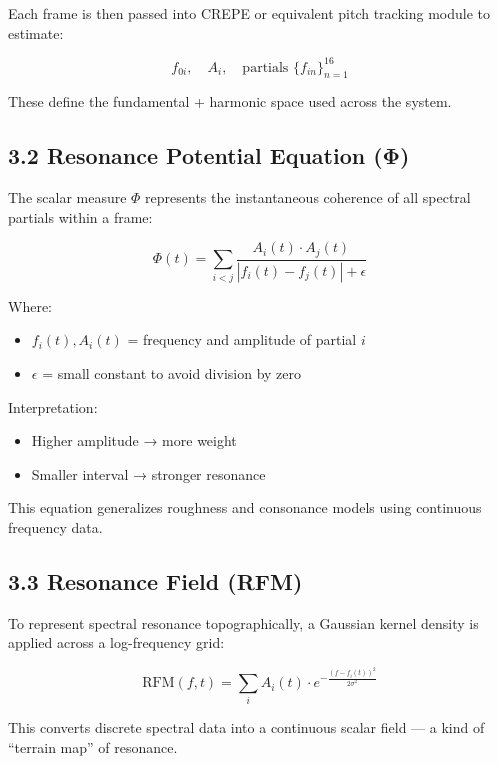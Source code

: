 Each frame is then passed into CREPE or equivalent pitch tracking module to estimate:

\begin{equation}
f_{0i}, \quad A_i, \quad \text{partials } \{f_{in}\}_{n=1}^{16}
\end{equation}

These define the fundamental + harmonic space used across the system.

\subsection*{3.2 Resonance Potential Equation (Φ)}

The scalar measure $\Phi$ represents the instantaneous coherence of all spectral partials within a frame:

\begin{equation}
\Phi(t) = \sum_{i<j} \frac{A_i(t) \cdot A_j(t)}{|f_i(t) - f_j(t)| + \epsilon}
\end{equation}

Where:
\begin{itemize}
  \item $f_i(t), A_i(t)$ = frequency and amplitude of partial $i$
  \item $\epsilon$ = small constant to avoid division by zero
\end{itemize}

Interpretation:
\begin{itemize}
  \item Higher amplitude → more weight
  \item Smaller interval → stronger resonance
\end{itemize}

This equation generalizes roughness and consonance models using continuous frequency data.

\subsection*{3.3 Resonance Field (RFM)}

To represent spectral resonance topographically, a Gaussian kernel density is applied across a log-frequency grid:

\begin{equation}
\text{RFM}(f, t) = \sum_i A_i(t) \cdot e^{-\frac{(f - f_i(t))^2}{2\sigma^2}}
\end{equation}

This converts discrete spectral data into a continuous scalar field — a kind of “terrain map” of resonance.

